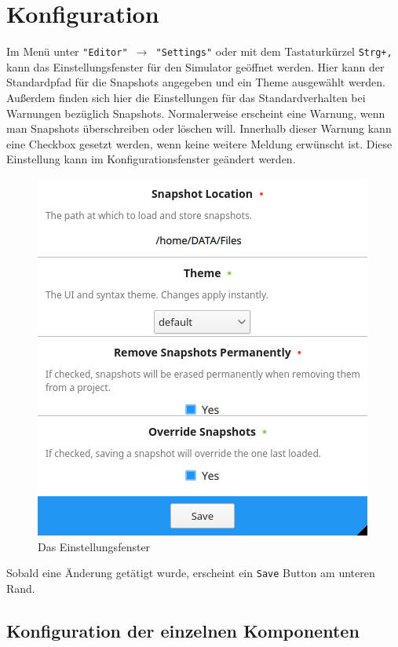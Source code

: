 
\section{Konfiguration}
\label{user-manual-configuration}

Im Menü unter \texttt{"Editor" $\rightarrow$ "Settings"} oder mit dem
Tastaturkürzel \texttt{Strg+,} kann das Einstellungsfenster für den Simulator
geöffnet werden. Hier kann der Standardpfad für die Snapshots angegeben und ein
Theme ausgewählt werden. Außerdem finden sich hier die Einstellungen für das
Standardverhalten bei Warnungen bezüglich Snapshots. Normalerweise erscheint
eine Warnung, wenn man Snapshots überschreiben oder löschen will.  Innerhalb
dieser Warnung kann eine Checkbox gesetzt werden, wenn keine weitere Meldung
erwünscht ist. Diese Einstellung kann im Konfigurationsfenster geändert werden.

\begin{figure}[ht]
	\centering
  \includegraphics[scale=0.9]{Images/Settings}
	\caption{Das Einstellungsfenster}
	\label{Settings}
\end{figure}


Sobald eine Änderung getätigt wurde, erscheint ein \texttt{Save} Button am
unteren Rand.


\subsection{Konfiguration der einzelnen Komponenten}

